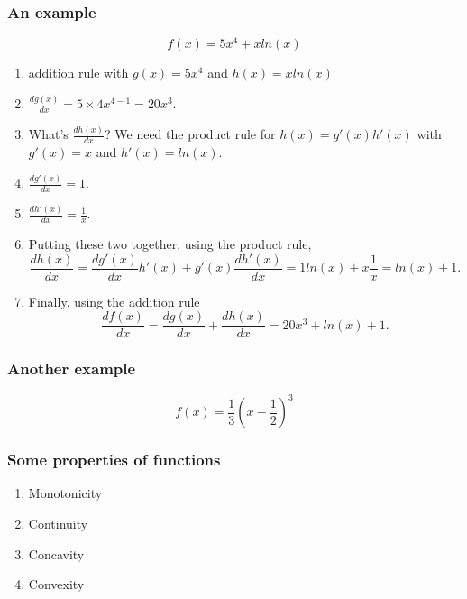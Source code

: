 \documentclass[xcolor=pdftex,dvipsnames]{beamer}
\begin{document}
\begin{frame}
\frametitle{An example}

\[f(x) = 5x^4+xln(x)
\]
\begin{enumerate}
\item<2,3,4,8>
 addition rule with $g(x) = 5x^4$ and $h(x)=xln(x)$\bigskip
\item <3,8>
$\frac{dg(x)}{dx} = 5\times 4x^{4-1} = 20x^3$.
\item<4,5,6,7>
What's $\frac{dh(x)}{dx}$? We need the product rule for $h(x) = g'(x)h'(x)$ with $g'(x) = x$
and $h'(x) = ln(x)$.
\item <5,7> $\frac{dg'(x)}{dx} = 1$.
\item<6,7> $\frac{dh'(x)}{dx} = \frac{1}{x}$.
\item<7,8> Putting these two together, using the product rule, 
\[\frac{dh(x)}{dx} = \frac{dg'(x)}{dx}h'(x) + g'(x) \frac{dh'(x)}{dx} =
1ln(x) + x\frac{1}{x} = ln(x)+1.
\]
\item<8>Finally, using the addition rule
\[
\frac{df(x)}{dx} = \frac{dg(x)}{dx} +\frac{dh(x)}{dx} = 20x^3 + ln(x)
+ 1.
\]
\end{enumerate}



\end{frame}
\begin{frame}
\frametitle{Another example}
\[f(x) =  \frac{1}{3}\left(x-\frac{1}{2}\right)^3
\]
\bigskip




\end{frame}
\begin{frame}
\frametitle{Some properties of functions}
\begin{enumerate}
\item Monotonicity
\item Continuity
\item Concavity
\item Convexity
\end{enumerate}
\end{frame}
\end{document}
